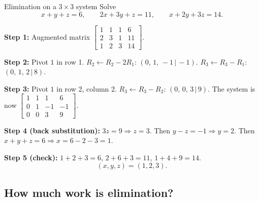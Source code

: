 \begin{sample}{Elimination on a $3\times3$ system}
Solve
\[
x+y+z=6,\qquad 2x+3y+z=11,\qquad x+2y+3z=14 .
\]

\textbf{Step 1:} Augmented matrix
$\left[\begin{array}{ccc|c}1&1&1&6\\2&3&1&11\\1&2&3&14\end{array}\right]$.

\textbf{Step 2:} Pivot $1$ in row 1. $R_2\leftarrow R_2-2R_1$: $(0,\,1,\,-1\,|\,-1)$. $R_3\leftarrow R_3-R_1$: $(0,\,1,\,2\,|\,8)$.

\textbf{Step 3:} Pivot $1$ in row 2, column 2. $R_3\leftarrow R_3-R_2$: $(0,\,0,\,3\,|\,9)$. The system is now
$\left[\begin{array}{ccc|c}1&1&1&6\\0&1&-1&-1\\0&0&3&9\end{array}\right]$.

\textbf{Step 4 (back substitution):} $3z=9\Rightarrow z=3$. Then $y-z=-1\Rightarrow y=2$. Then $x+y+z=6\Rightarrow x=6-2-3=1$.

\textbf{Step 5 (check):} $1+2+3=6$, $2+6+3=11$, $1+4+9=14$.
\[
\boxed{(x,y,z)=(1,2,3).}
\]
\end{sample}

\subsection{How much work is elimination?}


